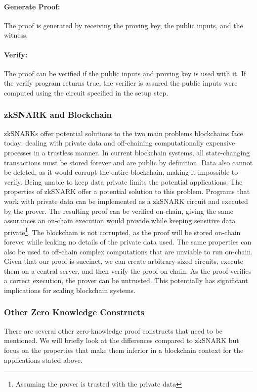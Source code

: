 \documentclass[../../thesis.tex]{subfiles}
\begin{document}
\paragraph{Generate Proof:}
The proof is generated by receiving the proving key, the public inputs, and the witness. 

\paragraph{Verify:}
The proof can be verified if the public inputs and proving key is used with it. If the verify program returns true, the verifier is assured the public inputs were computed using the circuit specified in the setup step. 

\subsubsection{zkSNARK and Blockchain}
zkSNARKs offer potential solutions to the two main problems blockchains face today: dealing with private data and off-chaining computationally expensive processes in a trustless manner. In current blockchain systems, all state-changing transactions must be stored forever and are public by definition. Data also cannot be deleted, as it would corrupt the entire blockchain, making it impossible to verify. Being unable to keep data private limits the potential applications. The properties of zkSNARK offer a potential solution to this problem. Programs that work with private data can be implemented as a zkSNARK circuit and executed by the prover. The resulting proof can be verified on-chain, giving the same assurances an on-chain execution would provide while keeping sensitive data private\footnote{Assuming the prover is trusted with the private data}. The blockchain is not corrupted, as the proof will be stored on-chain forever while leaking no details of the private data used. The same properties can also be used to off-chain complex computations that are unviable to run on-chain. Given that our proof is succinct, we can create arbitrary-sized circuits, execute them on a central server, and then verify the proof on-chain. As the proof verifies a correct execution, the prover can be untrusted. This potentially has significant implications for scaling blockchain systems. 

\subsubsection{Other Zero Knowledge Constructs}
There are several other zero-knowledge proof constructs that need to be mentioned. We will briefly look at the differences compared to zkSNARK but focus on the properties that make them inferior in a blockchain context for the applications stated above. 
\end{document}
